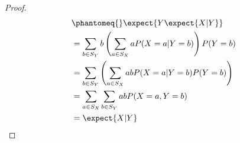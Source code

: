 \documentclass[
  coursecode={MTHE 455},
  assignmentname={Assignment \assignmentnumber},
  studentnumber=20053722,
  name={Bryan Hoang}
]{
  ltxanswer%
}
\begin{document}
\begin{questions}
\begin{parts}
      \newpage

      \part{}
      \begin{solution}
        \begin{proof}
          \begin{align*}
             &\phantomeq{} \expect{Y\expect{X|Y}}                                      \\
             &= \sum_{b \in S_{Y}} b\left(\sum_{a \in S_{X}} aP(X=a|Y=b)\right) P(Y=b) \\
             &= \sum_{b \in S_{Y}} \left(\sum_{a \in S_{X}} abP(X=a|Y=b)P(Y=b)\right)  \\
             &= \sum_{a \in S_{X}} \sum_{b \in S_{Y}} abP(X=a,Y=b)                     \\
             &= \expect{X|Y}
          \end{align*}
        \end{proof}
      \end{solution}
    \end{parts}
  \end{questions}
\end{document}
